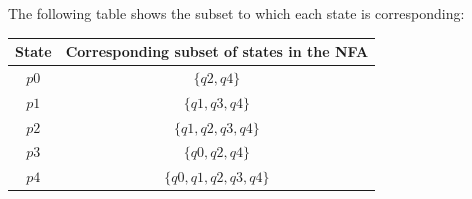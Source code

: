 \documentclass[12pt]{article}
\begin{document}
The following table shows the subset to which each state is corresponding:

\begin{center}
\begin{tabular}{|c|c|}
    \hline
    State & Corresponding subset of states in the NFA \\
    \hline
    $p0$ & $\{q2, q4\}$ \\
    $p1$ & $\{q1, q3, q4\}$ \\
    $p2$ & $\{q1, q2, q3, q4\}$ \\
    $p3$ & $\{q0, q2, q4\}$ \\
    $p4$ & $\{q0, q1, q2, q3, q4\}$ \\
    \hline
\end{tabular}
\end{center}
\end{document}
